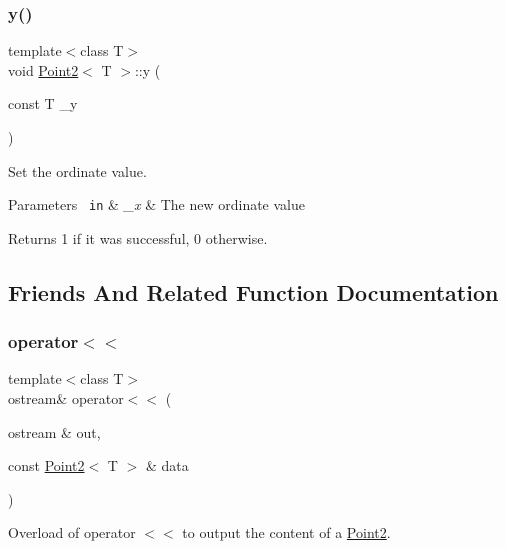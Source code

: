 \subsubsection{\texorpdfstring{y()}{y()}\hspace{0.1cm}{\footnotesize\ttfamily [2/2]}}
{\footnotesize\ttfamily template$<$class T$>$ \\
void \mbox{\hyperlink{class_point2}{Point2}}$<$ T $>$\+::y (\begin{DoxyParamCaption}\item[{const T}]{\+\_\+y }\end{DoxyParamCaption})\hspace{0.3cm}{\ttfamily [inline]}}



Set the ordinate value. 


\begin{DoxyParams}[1]{Parameters}
\mbox{\texttt{ in}}  & {\em \+\_\+x} & The new ordinate value \\
\hline
\end{DoxyParams}
\begin{DoxyReturn}{Returns}
1 if it was successful, 0 otherwise. 
\end{DoxyReturn}


\subsection{Friends And Related Function Documentation}
\mbox{\label{class_point2_a9156326af6248209210a7bd67569e5c2}} 
\subsubsection{\texorpdfstring{operator$<$$<$}{operator<<}}
{\footnotesize\ttfamily template$<$class T$>$ \\
ostream\& operator$<$$<$ (\begin{DoxyParamCaption}\item[{ostream \&}]{out,  }\item[{const \mbox{\hyperlink{class_point2}{Point2}}$<$ T $>$ \&}]{data }\end{DoxyParamCaption})\hspace{0.3cm}{\ttfamily [friend]}}



Overload of operator $<$$<$ to output the content of a {\ttfamily \mbox{\hyperlink{class_point2}{Point2}}}. 


